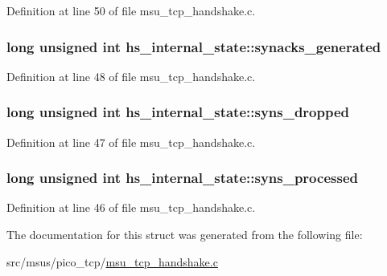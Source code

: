 Definition at line 50 of file msu\-\_\-tcp\-\_\-handshake.\-c.

\hypertarget{strucths__internal__state_a938f26b68569515e10c979fedeffd900}{
\subsubsection[{synacks\-\_\-generated}]{\setlength{\rightskip}{0pt plus 5cm}long unsigned int hs\-\_\-internal\-\_\-state\-::synacks\-\_\-generated}}\label{strucths__internal__state_a938f26b68569515e10c979fedeffd900}


Definition at line 48 of file msu\-\_\-tcp\-\_\-handshake.\-c.

\hypertarget{strucths__internal__state_ac1f543be2d395d301b51911280e8d15f}{
\subsubsection[{syns\-\_\-dropped}]{\setlength{\rightskip}{0pt plus 5cm}long unsigned int hs\-\_\-internal\-\_\-state\-::syns\-\_\-dropped}}\label{strucths__internal__state_ac1f543be2d395d301b51911280e8d15f}


Definition at line 47 of file msu\-\_\-tcp\-\_\-handshake.\-c.

\hypertarget{strucths__internal__state_a6e2c225d20dcaaea11c634daf95fbe77}{
\subsubsection[{syns\-\_\-processed}]{\setlength{\rightskip}{0pt plus 5cm}long unsigned int hs\-\_\-internal\-\_\-state\-::syns\-\_\-processed}}\label{strucths__internal__state_a6e2c225d20dcaaea11c634daf95fbe77}


Definition at line 46 of file msu\-\_\-tcp\-\_\-handshake.\-c.



The documentation for this struct was generated from the following file\-:\begin{DoxyCompactItemize}
\item 
src/msus/pico\-\_\-tcp/\hyperlink{msu__tcp__handshake_8c}{msu\-\_\-tcp\-\_\-handshake.\-c}\end{DoxyCompactItemize}
